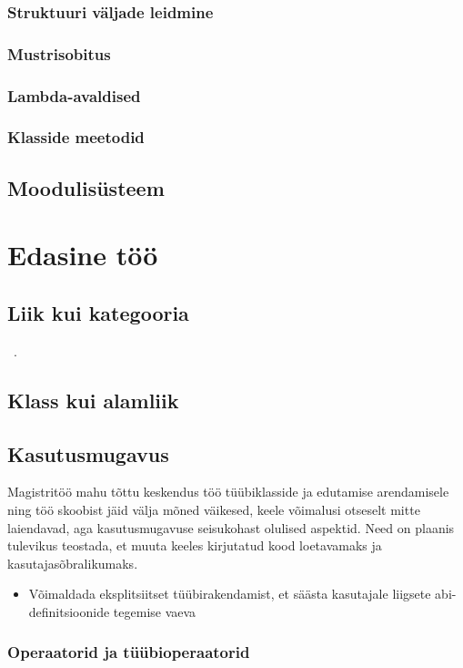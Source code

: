 \documentclass[12pt]{article}
\newcommand\peatykk[1]{
  \clearpage
  \section{#1}}
\begin{document}
      \subsubsection{Struktuuri väljade leidmine}
        
      \subsubsection{Mustrisobitus}
        
      \subsubsection{Lambda-avaldised}
        
      \subsubsection{Klasside meetodid}
        
    \subsection{Moodulisüsteem}
      
  \peatykk{Edasine töö}
    \subsection{Liik kui kategooria}
      ~\cite{Cat}.
    \subsection{Klass kui alamliik}
      
    \subsection{Kasutusmugavus}
      Magistritöö mahu tõttu keskendus töö tüübiklasside ja edutamise arendamisele ning töö skoobist jäid välja mõned väikesed, keele võimalusi otseselt mitte laiendavad, aga kasutusmugavuse seisukohast olulised aspektid. Need on plaanis tulevikus teostada, et muuta keeles kirjutatud kood loetavamaks ja kasutajasõbralikumaks.
      \begin{itemize}
        \item
          Võimaldada eksplitsiitset tüübirakendamist, et säästa kasutajale liigsete abi-definitsioonide tegemise vaeva
      \end{itemize}
      \subsubsection{Operaatorid ja tüübioperaatorid}
        
\end{document}
